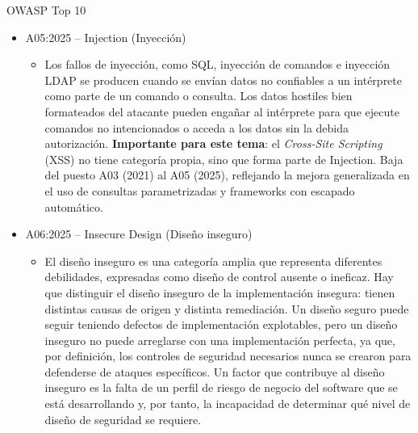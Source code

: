 \documentclass[aspectratio=169,10pt]{beamer}
\begin{document}
\begin{frame}[allowframebreaks]{OWASP Top 10}
\small
  \begin{itemize}
  \item A05:2025 -- Injection (Inyección)
    \begin{itemize}

  \item Los fallos de inyección, como SQL, inyección de comandos e inyección LDAP se producen cuando se envían datos no confiables a un intérprete como parte de un comando o consulta. Los datos hostiles bien formateados del atacante pueden engañar al intérprete para que ejecute comandos no intencionados o acceda a los datos sin la debida autorización. \textbf{Importante para este tema}: el \emph{Cross-Site Scripting} (XSS) no tiene categoría propia, sino que forma parte de Injection. Baja del puesto A03 (2021) al A05 (2025), reflejando la mejora generalizada en el uso de consultas parametrizadas y frameworks con escapado automático.
    \end{itemize}
  \item A06:2025 -- Insecure Design (Diseño inseguro)
  \begin{itemize}

  \item El diseño inseguro es una categoría amplia que representa diferentes debilidades, expresadas como \textquotedbl{}diseño de control ausente o ineficaz\textquotedbl{}. Hay que distinguir el diseño inseguro de la implementación insegura: tienen distintas causas de origen y distinta remediación. Un diseño seguro puede seguir teniendo defectos de implementación explotables, pero un diseño inseguro no puede arreglarse con una implementación perfecta, ya que, por definición, los controles de seguridad necesarios nunca se crearon para defenderse de ataques específicos. Un factor que contribuye al diseño inseguro es la falta de un perfil de riesgo de negocio del software que se está desarrollando y, por tanto, la incapacidad de determinar qué nivel de diseño de seguridad se requiere.
  \end{itemize}
    \end{itemize}
\end{frame}
\end{document}
